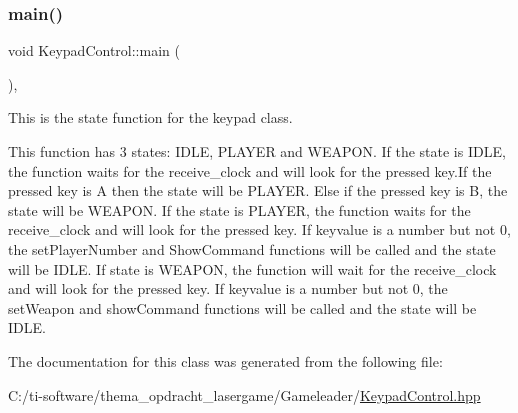 \subsubsection{\texorpdfstring{main()}{main()}\hspace{0.1cm}{\footnotesize\ttfamily [2/2]}}
{\footnotesize\ttfamily void Keypad\+Control\+::main (\begin{DoxyParamCaption}{ }\end{DoxyParamCaption})\hspace{0.3cm}{\ttfamily [inline]}, {\ttfamily [override]}}



This is the state function for the keypad class. 

This function has 3 states\+: I\+D\+LE, P\+L\+A\+Y\+ER and W\+E\+A\+P\+ON. If the state is I\+D\+LE, the function waits for the receive\+\_\+clock and will look for the pressed key.\+If the pressed key is A then the state will be P\+L\+A\+Y\+ER. Else if the pressed key is B, the state will be W\+E\+A\+P\+ON. If the state is P\+L\+A\+Y\+ER, the function waits for the receive\+\_\+clock and will look for the pressed key. If keyvalue is a number but not 0, the set\+Player\+Number and Show\+Command functions will be called and the state will be I\+D\+LE. If state is W\+E\+A\+P\+ON, the function will wait for the receive\+\_\+clock and will look for the pressed key. If keyvalue is a number but not 0, the set\+Weapon and show\+Command functions will be called and the state will be I\+D\+LE. 

The documentation for this class was generated from the following file\+:\begin{DoxyCompactItemize}
\item 
C\+:/ti-\/software/thema\+\_\+opdracht\+\_\+lasergame/\+Gameleader/\mbox{\hyperlink{_gameleader_2_keypad_control_8hpp}{Keypad\+Control.\+hpp}}\end{DoxyCompactItemize}
